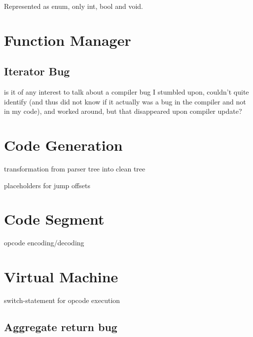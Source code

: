         Represented as enum, only int, bool and void.
    
    \section{Function Manager}
    
        
        \subsection{Iterator Bug}
            
            is it of any interest to talk about a compiler bug I stumbled upon, couldn't quite identify (and thus did not know if it actually was a bug in the compiler and not in my code), and worked around, but that disappeared upon compiler update?
    
    \section{Code Generation}
    
        transformation from parser tree into clean tree
    
        placeholders for jump offsets
        
    \section{Code Segment}
        
        opcode encoding/decoding
        
    \section{Virtual Machine}
        
        switch-statement for opcode execution
        
        \subsection{Aggregate return bug}



